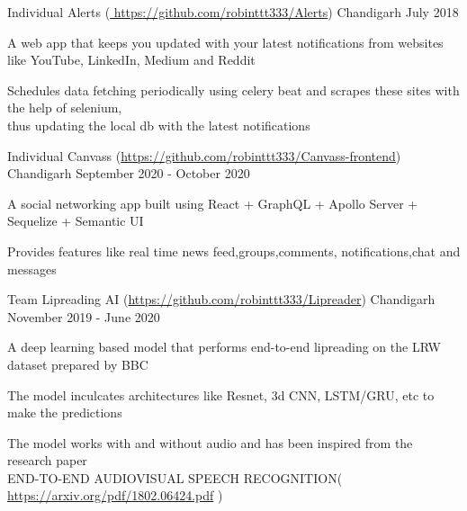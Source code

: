 


\begin{cventries}

\cventry
{Individual} %
{Alerts \scriptsize(\url{ https://github.com/robinttt333/Alerts})} %
{Chandigarh} %
{July 2018 } %
{ %
\begin{cvitems}
\item {A web app that keeps you updated with your latest notifications from websites like YouTube, LinkedIn, Medium and Reddit}
\item {Schedules data fetching periodically using celery beat and scrapes these sites with the help of selenium,\\ thus updating the local db with the latest notifications}
\end{cvitems}
}

\cventry
{Individual} %
{Canvass \scriptsize(\url{https://github.com/robinttt333/Canvass-frontend})} %
{Chandigarh} %
{September 2020 - October 2020 } %
{ %
\begin{cvitems}
\item {A social networking app built using React + GraphQL + Apollo Server + Sequelize + Semantic UI}
\item{Provides features like real time news feed,groups,comments, notifications,chat and messages}
\end{cvitems}
}


\cventry
{Team} %
{Lipreading AI \scriptsize(\url{https://github.com/robinttt333/Lipreader})} %
{Chandigarh} %
{November 2019 - June 2020} %
{ %
\begin{cvitems}
\item {A deep learning based model that performs end-to-end lipreading on the LRW dataset prepared by BBC}
\item {The model inculcates architectures like Resnet, 3d CNN, LSTM/GRU, etc to make the predictions}
\item {The model works with and without audio and has been inspired from the research paper \\ 
\scriptsize{END-TO-END AUDIOVISUAL SPEECH RECOGNITION( \tiny{\url{https://arxiv.org/pdf/1802.06424.pdf}} )}
}
\end{cvitems}
}


\end{cventries}
